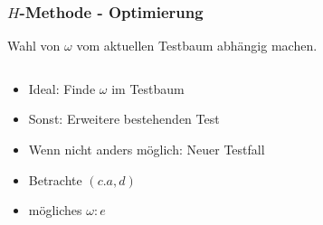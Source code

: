 \documentclass[10pt]{beamer}
\begin{document}
\begin{frame}
  \frametitle{$H$-Methode - Optimierung}
    Wahl von $\omega$ vom aktuellen Testbaum abhängig machen.
  
  \begin{columns}[T] %
    \begin{column}{.3\textwidth}
        \pause
	    \begin{itemize}
		  \item Ideal: Finde $\omega$ im Testbaum
		  \item Sonst: Erweitere bestehenden Test
		  \item Wenn nicht anders möglich: Neuer Testfall 
		\end{itemize}
	    \begin{itemize}
		  \item Betrachte $(c.a,d)$
		  \item mögliches $\omega: e$
	    \end{itemize}
    \end{column}%

    \begin{column}{.70\textwidth}
    \end{column}%
  \end{columns}
\end{frame}
\end{document}
